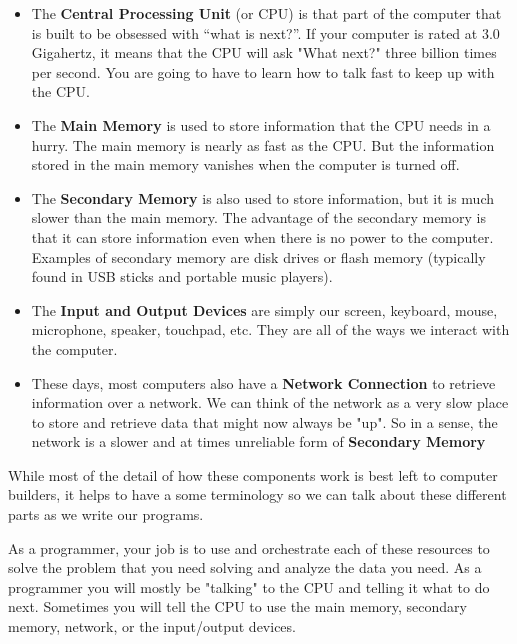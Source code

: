 \documentclass[10pt]{book}
\begin{document}
\begin{itemize}

\item The {\bf Central Processing Unit} (or CPU) is 
that part of the computer that is built to be obsessed 
with ``what is next?''.  If your computer is rated
at 3.0 Gigahertz, it means that the CPU will ask "What next?"
three billion times per second.  You are going to have to 
learn how to talk fast to keep up with the CPU.

\item The {\bf Main Memory} is used to store information
that the CPU needs in a hurry.  The main memory is nearly as 
fast as the CPU.  But the information stored in the main
memory vanishes when the computer is turned off.

\item The {\bf Secondary Memory} is also used to store
information, but it is much slower than the main memory.
The advantage of the secondary memory is that it can
store information even when there is no power to the
computer.  Examples of secondary memory are disk drives
or flash memory (typically found in USB sticks and portable
music players).

\item The {\bf Input and Output Devices} are simply our
screen, keyboard, mouse, microphone, speaker, touchpad, etc.  
They are all of the ways we interact with the computer.

\item These days, most computers also have a
{\bf Network Connection} to retrieve information over a network.
We can think of the network as a very slow place to store and
retrieve data that might now always be "up".  So in a sense,
the network is a slower and at times unreliable form of
{\bf Secondary Memory}

\end{itemize}

While most of the detail of how these components work is best left 
to computer builders, it helps to have a some terminology
so we can talk about these different parts as we write our programs.

As a programmer, your job is to use and orchestrate 
each of these resources to solve the problem that you need solving
and analyze the data you need.  As a programmer you will 
mostly be "talking" to the CPU and telling it what to 
do next.  Sometimes you will tell the CPU to use the main memory,
secondary memory, network, or the input/output devices.
\end{document}
